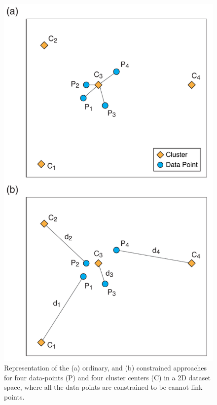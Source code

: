 \begin{figure}
	\centering
	\includegraphics[width=\columnwidth]{figures/pdf/figure-04}
	\caption{Representation of the (a) ordinary, and (b) constrained \kmeans{} approaches for four data-points (P) and four cluster centers (C) in a 2D dataset space, where all the data-points are constrained to be cannot-link points. }
	\label{fig:con_kmeans}
\end{figure}


